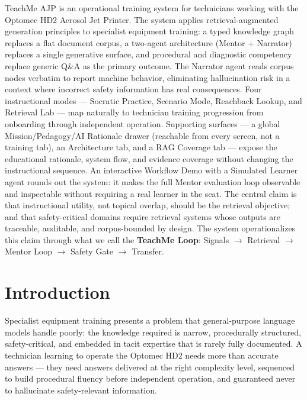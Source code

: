 \documentclass[11pt,letterpaper]{article}
\newcommand{\arrowto}{$\rightarrow$}
\begin{document}
TeachMe AJP is an operational training system for technicians working with the Optomec HD2 Aerosol Jet Printer. The system applies retrieval-augmented generation principles to specialist equipment training: a typed knowledge graph replaces a flat document corpus, a two-agent architecture (Mentor + Narrator) replaces a single generative surface, and procedural and diagnostic competency replace generic Q\&A as the primary outcome. The Narrator agent reads corpus nodes verbatim to report machine behavior, eliminating hallucination risk in a context where incorrect safety information has real consequences. Four instructional modes --- Socratic Practice, Scenario Mode, Reachback Lookup, and Retrieval Lab --- map naturally to technician training progression from onboarding through independent operation. Supporting surfaces --- a global Mission/Pedagogy/AI Rationale drawer (reachable from every screen, not a training tab), an Architecture tab, and a RAG Coverage tab --- expose the educational rationale, system flow, and evidence coverage without changing the instructional sequence. An interactive Workflow Demo with a Simulated Learner agent rounds out the system: it makes the full Mentor evaluation loop observable and inspectable without requiring a real learner in the seat. The central claim is that instructional utility, not topical overlap, should be the retrieval objective; and that safety-critical domains require retrieval systems whose outputs are traceable, auditable, and corpus-bounded by design. The system operationalizes this claim through what we call the \textbf{TeachMe Loop}: Signals \arrowto{} Retrieval \arrowto{} Mentor Loop \arrowto{} Safety Gate \arrowto{} Transfer.

\section{Introduction}
\label{sec:introduction}

Specialist equipment training presents a problem that general-purpose language models handle poorly: the knowledge required is narrow, procedurally structured, safety-critical, and embedded in tacit expertise that is rarely fully documented. A technician learning to operate the Optomec HD2 needs more than accurate answers --- they need answers delivered at the right complexity level, sequenced to build procedural fluency before independent operation, and guaranteed never to hallucinate safety-relevant information.
\end{document}
